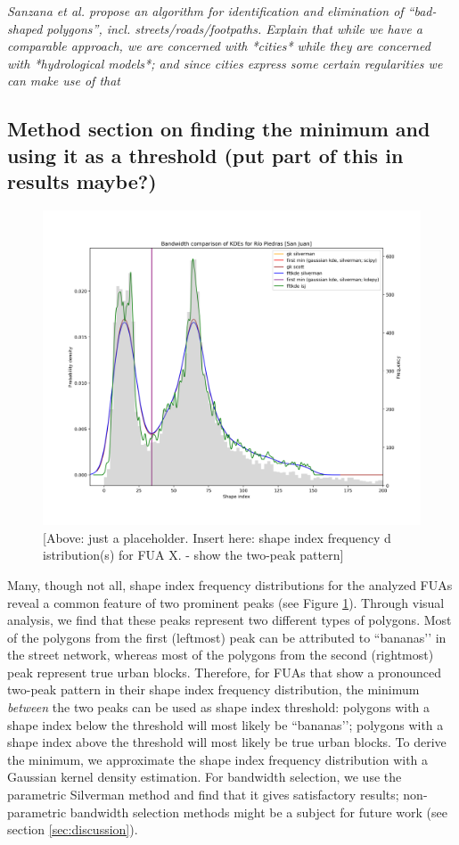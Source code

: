 \textit{Sanzana et al. propose an algorithm for identification and elimination of
``bad-shaped polygons'', incl. streets/roads/footpaths. Explain that while we have
a comparable approach, we are concerned with *cities* while they are concerned
with *hydrological models*; and since cities express some certain regularities
we can make use of that}

\subsection*{Method section on finding the minimum and using it as a threshold
(put part of this in results maybe?)}

\begin{figure}
    \centering
    \includegraphics[width=0.5\linewidth]{figures/308}
    \caption{[Above: just a placeholder. Insert here: shape index frequency d
    istribution(s) for FUA X. - show the two-peak pattern]}
    \label{fig:si-dist}
\end{figure}

Many, though not all, shape index frequency distributions for the analyzed FUAs reveal a
common feature of two prominent peaks (see Figure \ref{fig:si-dist}). Through visual
analysis, we find that these peaks represent two different types of polygons. Most of
the polygons from the first (leftmost) peak can be attributed to ``bananas’’ in the
street network, whereas most of the polygons from the second (rightmost) peak represent
true urban blocks. Therefore, for FUAs that show a pronounced two-peak pattern in their
shape index frequency distribution, the minimum \textit{between} the two peaks can be
used as shape index threshold: polygons with a shape index below the threshold will most
likely be ``bananas’’; polygons with a shape index above the threshold will most likely
be true urban blocks. To derive the minimum, we approximate the shape index frequency
distribution with a Gaussian kernel density estimation. For bandwidth selection, we use
the parametric Silverman method \cite{silverman_using_1981} and find that it gives
satisfactory results; non-parametric bandwidth selection methods might be a subject for
future work (see section \ref{sec:discussion}).

